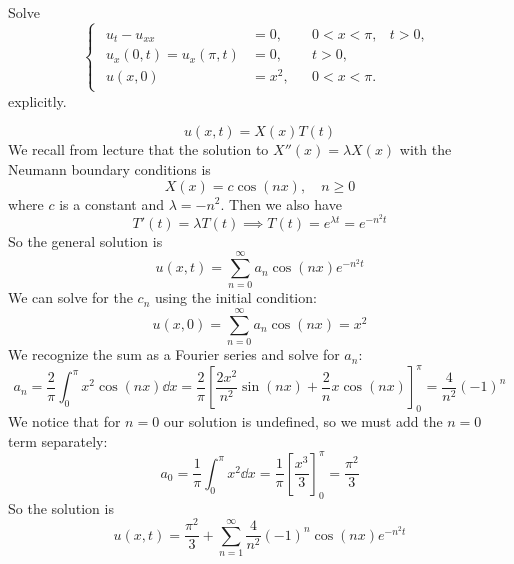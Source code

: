 \documentclass[plain]{pset}
\begin{document}
\pagebreak

\begin{problem}
Solve
\[
    \begin{cases}
        \begin{aligned}
            u_t - u_{xx}            & = 0,   &  & 0 < x < \pi, & t > 0, \\
            u_x(0, t) = u_x(\pi, t) & = 0,   &  & t > 0,                \\
            u(x, 0)                 & = x^2, &  & 0 < x < \pi.
        \end{aligned}
    \end{cases}
\]
explicitly.
\end{problem}

\begin{solution}
    \[u(x, t) = X(x)T(t)\]
    We recall from lecture that the solution to \(X''(x) = \lambda X(x)\) with the Neumann boundary conditions is
    \[
        X(x) = c \cos(nx), \quad n \geq 0
    \]
    where \(c\) is a constant and \(\lambda = -n^2\). Then we also have
    \[T'(t) = \lambda T(t) \implies T(t) = e^{\lambda t} = e^{-n^2t}\]
    So the general solution is
    \[u(x, t) = \sum_{n=0}^\infty a_n \cos(nx) e^{-n^2t}\]
    We can solve for the \(c_n\) using the initial condition:
    \[u(x, 0) = \sum_{n=0}^\infty a_n \cos(nx) = x^2\]
    We recognize the sum as a Fourier series and solve for \(a_n\):
    \[a_n = \frac{2}{\pi} \int_0^\pi x^2 \cos(nx) \dd x = \frac{2}{\pi} \left[\frac{2x^2}{n^2} \sin(nx) + \frac{2}{n}x\cos(nx)\right]_0^\pi = \frac{4}{n^2}(-1)^n\]
    We notice that for \(n = 0\) our solution is undefined, so we must add the \(n = 0\) term separately:
    \[a_0 = \frac{1}{\pi} \int_0^\pi x^2 \dd x = \frac{1}{\pi} \left[\frac{x^3}{3}\right]_0^\pi = \frac{\pi^2}{3}\]
    So the solution is
    \[u(x, t) = \frac{\pi^2}{3} + \sum_{n=1}^\infty \frac{4}{n^2}(-1)^n \cos(nx) e^{-n^2t}\]
\end{solution}

\pagebreak
\end{document}
